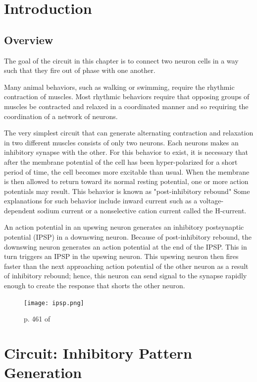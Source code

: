 \documentclass[12]{book}
\newcommand\0{\mathbf{0}}
\newcommand\<{\langle}
\renewcommand\>{\rangle}
\begin{document}
\section{Introduction}

\subsection{Overview}

The goal of the circuit in this chapter is to connect two neuron cells in a way such that they fire out of phase with one another.

Many animal behaviors, such as walking or swimming, require the rhythmic contraction of muscles. Most rhythmic behaviors require that opposing groups of muscles be contracted and relaxed in a coordinated manner and so requiring the coordination of a network of neurons.

The very simplest circuit that can generate alternating contraction and relaxation in two different muscles consists of only two neurons. Each neurons makes an inhibitory synapse with the other. For this behavior to exist, it is necessary that after the membrane potential of the cell has been hyper-polarized for a short period of time, the cell becomes more excitable than usual. When the membrane is then allowed to return toward its normal resting potential, one or more action potentials may result. This behavior is known as "post-inhibitory rebound" Some explanations for such behavior include inward current such as a voltage-dependent sodium current or a nonselective cation current called the H-current.

An action potential in an upswing neuron generates an inhibitory postsynaptic potential (IPSP) in a downswing neuron. Because of post-inhibitory rebound, the downswing neuron generates an action potential at the end of the IPSP. This in turn triggers an IPSP in the upswing neuron. This upswing neuron then fires faster than the next approaching action potential of the other neuron as a result of inhibitory rebound; hence, this neuron can send signal to the synapse rapidly enough to create the response that shorts the other neuron.

\begin{figure}[h]
\centering
\texttt{[image: ipsp.png]}	
\caption{p. 461 of \cite{levitan2015neuron}}
\end{figure}

\section{Circuit: Inhibitory Pattern Generation}
\end{document}
